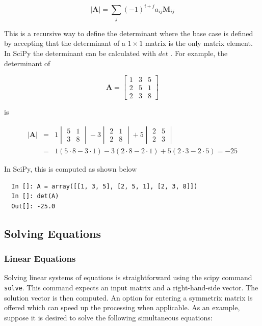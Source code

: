 \documentclass{article}
\begin{document}
    \[ \left|\mathbf{A}\right|=\sum_{j}\left(-1\right)^{i+j}a_{ij}\mathbf{M}_{ij} \]

This is a recursive way to define the determinant where the base case
is defined by accepting that the determinant of a $1\times1$ matrix is
the only matrix element. In SciPy the determinant can be calculated
with $det$ . For example, the determinant of

    \[ \mathbf{A}=\begin{bmatrix} 1 & 3 & 5\\ 2 & 5 & 1\\ 2 & 3 & 8\end{bmatrix}\]

is

    \begin{eqnarray*} 
      |\mathbf{A}| & = & 1\begin{vmatrix} 5 & 1\\ 3 & 8\end{vmatrix}
                        -3\begin{vmatrix} 2 & 1\\ 2 & 8\end{vmatrix}
                        +5\begin{vmatrix}2 & 5\\ 2 & 3\end{vmatrix}\\  
                   & = & 1(5\cdot8-3\cdot1)-3(2\cdot8-2\cdot1)+5(2\cdot3-2\cdot5)=-25
    \end{eqnarray*}

In SciPy, this is computed as shown below

\begin{lstlisting}
  In []: A = array([[1, 3, 5], [2, 5, 1], [2, 3, 8]])
  In []: det(A)
  Out[]: -25.0
\end{lstlisting}

\subsection{Solving Equations}

\subsubsection{Linear Equations}

Solving linear systems of equations is straightforward using the scipy
command \lstinline+solve+. This command expects an input matrix and a
right-hand-side vector. The solution vector is then computed. An
option for entering a symmetrix matrix is offered which can speed up
the processing when applicable.  As an example, suppose it is desired
to solve the following simultaneous equations:
\end{document}
